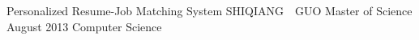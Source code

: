 \maketitlepage
{Personalized Resume-Job Matching System
}   %
{SHIQIANG~~GUO}%
{Master of Science}                %
{August 2013}%
{Computer Science}         %
